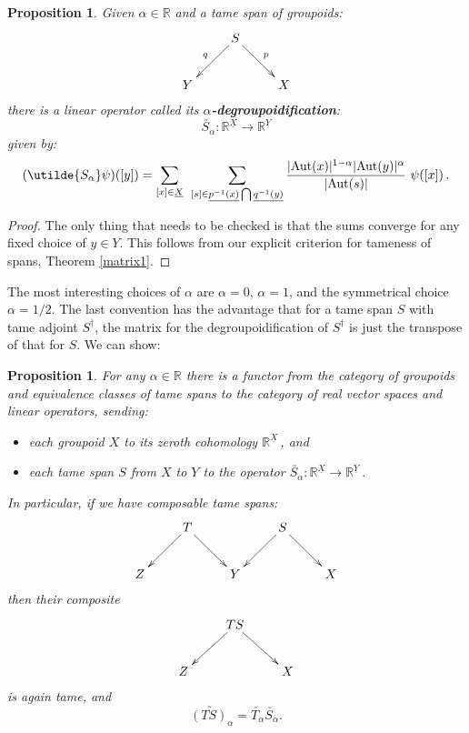 \documentclass{article}
\renewcommand{\to}{\rightarrow}
\newcommand{\maps}{\colon}
\newcommand{\R}{{\mathbb R}}
\newcommand{\Aut}{{\rm Aut}}
\renewcommand{\u}[1]{\underline{#1}}
\newtheorem{proposition}[thm]{Proposition}
\begin{document}
\begin{proposition}
\label{cohomological_alpha_degroupoidification}
Given $\alpha \in \R$ and a tame span of groupoids:
\[\xymatrix{
 & S\ar[dl]_q\ar[dr]^p & \\
 Y & & X \\
}\]
there is a linear operator 
called its {\bf \boldmath $\alpha$-degroupoidification}:
\[  \utilde{S_\alpha}\maps \R^{\u{X}}\to\R^{\u{Y}} \]
given by:
\[   
(\utilde{S_\alpha} \psi)([y]) = 
\sum_{[x] \in \u{X}} \;\,
\sum_{[s]\in\u{p^{-1}(x)}\bigcap \u{q^{-1}(y)}}
\frac{|\Aut(x)|^{1-\alpha}|\Aut(y)|^\alpha}{|\Aut(s)|} \,\, \psi([x]) \,. 
\]
\end{proposition}

\begin{proof} 
The only thing that needs to be checked is that the sums converge
for any fixed choice of $y \in Y$.  This follows from our explicit
criterion for tameness of spans, Theorem \ref{matrix1}. 
\end{proof}

The most interesting choices of $\alpha$ are $\alpha = 0$, $\alpha =
1$, and the symmetrical choice $\alpha = 1/2$.  The last convention
has the advantage that for a tame span $S$ with tame adjoint
$S^\dagger$, the matrix for the degroupoidification of $S^\dagger$ is
just the transpose of that for $S$.  We can show:

\begin{proposition}\label{alphaspancompose}
For any $\alpha \in \R$ there is a functor from the category of
groupoids and equivalence classes of tame spans to the category of
real vector spaces and linear
operators, sending:
\begin{itemize}
\item
each groupoid $X$ to its zeroth cohomology $\R^{\u{X}}\,$, and
\item 
each tame span $S$ from $X$ to $Y$ to the operator
$\utilde{S_\alpha} \maps \R^{\u{X}} \to \R^{\u{Y}}\,$.
\end{itemize}
In particular, if we have composable tame spans:
\[
\xymatrix{
& T\ar[dl]_{} \ar[dr]^{} & & S \ar[dl]_{} \ar[dr]^{}& \\
Z & & Y & & X
}
\]  
then their composite
\[\xymatrix{
 & TS \ar[dl]_{} \ar[dr]^{} & \\
 Z & & X \\
}\]
is again tame, and
\[       \utilde{(TS)_\alpha} = \utilde{T_\alpha} \utilde{S_\alpha}  .\]
\end{proposition}
\end{document}
